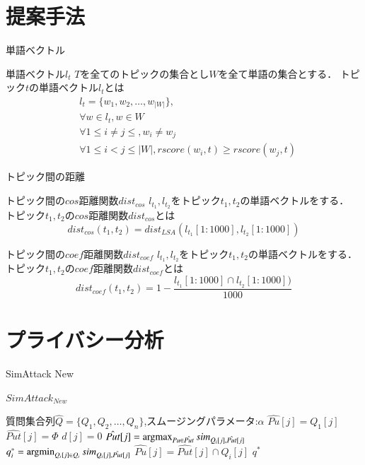 \documentclass[14pt,xcolor=dvipsnames,table,dvipdfmx]{beamer}
\newcommand{\argmin}{\operatornamewithlimits{argmin}}
\newcommand{\argmax}{\operatornamewithlimits{argmax}}
\begin{document}
\section{提案手法}
\begin{frame}{単語ベクトル}
    \begin{block}{単語ベクトル$l_t$}
		$T$を全てのトピックの集合とし$W$を全て単語の集合とする．
		トピック$t$の単語ベクトル$l_t$とは
		\begin{equation}
		\begin{aligned}
			& l_t  = \{w_1,w_2, \dots , w_{|W|}\}, \\
			& \forall w \in l_t, w \in W \\
			& \forall  1 \leq i \neq j \leq, w_i \neq w_j \\
			& \forall 1 \leq i < j \leq |W|,rscore(w_i,t) \geq rscore(w_j,t) 
		\end{aligned}
		\end{equation}
    \end{block}
\end{frame}

\begin{frame}{トピック間の距離}
    \begin{block}{トピック間の$cos$距離関数$dist_{cos}$}
		$l_{t_1},l_{t_2}$をトピック$t_1,t_2$の単語ベクトルをする．
		トピック$t_1,t_2$の$cos$距離関数$dist_{cos}$とは
        \begin{equation}
			dist_{cos}(t_1,t_2) = dist_{LSA}(l_{t_1}[1:1000],l_{t_2}[1:1000])
        \end{equation}
    \end{block}
    \begin{block}{トピック間の$coef$距離関数$dist_{coef}$}
		$l_{t_1},l_{t_2}$をトピック$t_1,t_2$の単語ベクトルをする．
		トピック$t_1,t_2$の$coef$距離関数$dist_{coef}$とは
        \begin{equation}
			dist_{coef}(t_1,t_2) = 1 - \frac{l_{t_1}[1:1000] \cap l_{t_2}[1:1000])}{1000}
        \end{equation}
    \end{block}
\end{frame}


\section{プライバシー分析}
\begin{frame}{SimAttack New}
\fontsize{12pt}{7.2}\selectfont
	\begin{block}{$SimAttack_{New}$}
	\begin{algorithmic}[1]
		\REQUIRE 質問集合列$\hat{Q}=\{ Q_1,Q_2, \dots , Q_n\}$,スムージングパラメータ:$\alpha$
			\STATE $\hat{Pu}[j] = Q_1[j]$
			\STATE $\hat{Put}[j] = \Phi$
			\STATE $d[j] = 0$
		\ENDFOR
				\STATE $\hat{Put}[j] = \argmax_{Pu \in \hat{Put}}sim_{Q_i[j],\hat{Put}[j]}$
			\ENDFOR
			\STATE $q^*_i = \argmin_{Q_i[j] \in Q_i}sim_{Q_i[j],\hat{Put}[j]}$
				\STATE $\hat{Pu}[j] = \hat{Put}[j] \cap Q_i[j]$
			\ENDFOR
		\ENDFOR
		\ENSURE $q^*$
	\end{algorithmic}
	\end{block}
\end{frame}
\end{document}
